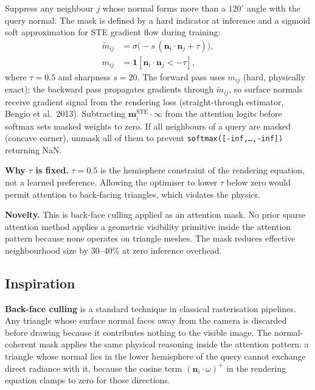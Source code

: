 \documentclass[11pt,letterpaper]{article}
\newcommand{\code}[1]{\texttt{#1}}
\begin{document}
Suppress any neighbour $j$ whose normal forms more than a $120^\circ$
angle with the query normal.
The mask is defined by a hard indicator at inference and a sigmoid
soft approximation for STE gradient flow during training:
\begin{align}
  \tilde{m}_{ij} &= \sigma\!\bigl(-s\,(\mathbf{n}_i \cdot \mathbf{n}_j + \tau)\bigr),
  \label{eq:ncmask_soft_a2} \\
  m_{ij}         &= \mathbf{1}[\mathbf{n}_i \cdot \mathbf{n}_j < -\tau],
  \label{eq:ncmask_hard_a2}
\end{align}
where $\tau = 0.5$ and sharpness $s = 20$.
The forward pass uses $m_{ij}$ (hard, physically exact); the backward
pass propagates gradients through $\tilde{m}_{ij}$, so surface normals
receive gradient signal from the rendering loss (straight-through
estimator, Bengio et al.\ 2013).
Subtracting $\mathbf{m}_i^{\text{STE}} \cdot \infty$ from the attention
logits before softmax sets masked weights to zero.
If all neighbours of a query are masked (concave corner), unmask all
of them to prevent \code{softmax([-inf,\ldots,-inf])} returning NaN.

\textbf{Why $\tau$ is fixed.}
$\tau = 0.5$ is the hemisphere constraint of the rendering equation,
not a learned preference.
Allowing the optimiser to lower $\tau$ below zero would permit attention
to back-facing triangles, which violates the physics.

\begin{claimbox}
\textbf{Novelty.} This is back-face culling applied as an attention mask.
No prior sparse attention method applies a geometric visibility primitive
inside the attention pattern because none operates on triangle meshes.
The mask reduces effective neighbourhood size by 30--40\% at zero
inference overhead.
\end{claimbox}

\subsection{Inspiration}

\textbf{Back-face culling} is a standard technique in classical rasterisation
pipelines.
Any triangle whose surface normal faces away from the camera is discarded
before drawing because it contributes nothing to the visible image.
The normal-coherent mask applies the same physical reasoning inside the
attention pattern: a triangle whose normal lies in the lower hemisphere of
the query cannot exchange direct radiance with it, because the cosine term
$(\mathbf{n}_i \cdot \omega)^+$ in the rendering equation clamps to zero
for those directions.
\end{document}
